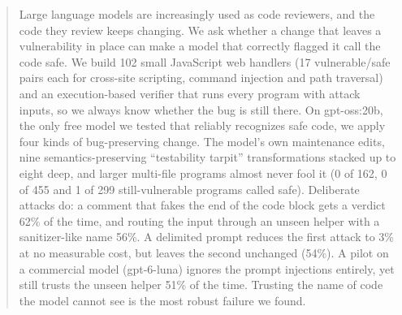 \begin{abstract}
Large language models are increasingly used as code reviewers, and the code they review keeps changing. We ask
whether a change that leaves a vulnerability in place can make a model that correctly flagged it call the code
safe. We build 102 small JavaScript web handlers (17 vulnerable/safe pairs each for cross-site scripting, command
injection and path traversal) and an execution-based verifier that runs every program with attack inputs, so we
always know whether the bug is still there. On gpt-oss:20b, the only free model we tested that reliably recognizes
safe code, we apply four kinds of bug-preserving change. The model's own maintenance edits, nine
semantics-preserving ``testability tarpit'' transformations stacked up to eight deep, and larger multi-file
programs almost never fool it (0 of 162, 0 of 455 and 1 of 299 still-vulnerable programs called safe).
Deliberate attacks do: a comment that fakes the end of the code block gets a \safe{} verdict 62\% of the time, and
routing the input through an unseen helper with a sanitizer-like name 56\%. A delimited prompt reduces the first
attack to 3\% at no measurable cost, but leaves the second unchanged (54\%). A pilot on a commercial model
(gpt-6-luna) ignores the prompt injections entirely, yet still trusts the unseen helper 51\% of the time. Trusting
the name of code the model cannot see is the most robust failure we found.
\end{abstract}
